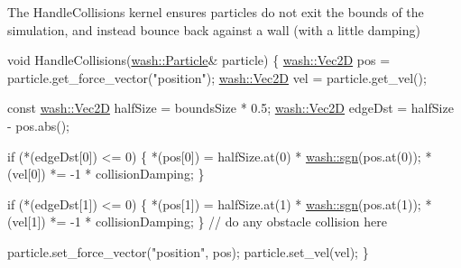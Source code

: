 The Handle\+Collisions kernel ensures particles do not exit the bounds of the simulation, and instead bounce back against a \textquotesingle{}wall\textquotesingle{} (with a little damping) 
\begin{DoxyCode}
\textcolor{keywordtype}{void} HandleCollisions(\mbox{\hyperlink{classwash_1_1Particle}{wash::Particle}}& particle) \{
    \mbox{\hyperlink{classwash_1_1Vec}{wash::Vec2D}} pos = particle.get\_force\_vector(\textcolor{stringliteral}{"position"});
    \mbox{\hyperlink{classwash_1_1Vec}{wash::Vec2D}} vel = particle.get\_vel();

    \textcolor{keyword}{const} \mbox{\hyperlink{classwash_1_1Vec}{wash::Vec2D}} halfSize = boundsSize * 0.5;
    \mbox{\hyperlink{classwash_1_1Vec}{wash::Vec2D}} edgeDst = halfSize - pos.abs();

    \textcolor{keywordflow}{if} (*(edgeDst[0]) <= 0) \{
        *(pos[0]) = halfSize.at(0) * \mbox{\hyperlink{namespacewash_a706d6d30508a81b6b9f25494cd759dff}{wash::sgn}}(pos.at(0));
        *(vel[0]) *= -1 * collisionDamping;
    \}

    \textcolor{keywordflow}{if} (*(edgeDst[1]) <= 0) \{
        *(pos[1]) = halfSize.at(1) * \mbox{\hyperlink{namespacewash_a706d6d30508a81b6b9f25494cd759dff}{wash::sgn}}(pos.at(1));
        *(vel[1]) *= -1 * collisionDamping;
    \}
    \textcolor{comment}{// do any obstacle collision here}

    particle.set\_force\_vector(\textcolor{stringliteral}{"position"}, pos);
    particle.set\_vel(vel);
\}
\end{DoxyCode}
 